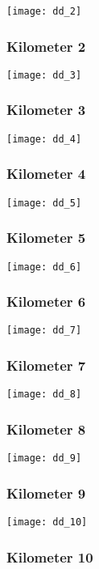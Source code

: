 \documentclass[]{article}
\begin{document}
\texttt{[image: dd\_2]}

\subsubsection{Kilometer 2}\label{kilometer-2-29}

\texttt{[image: dd\_3]}

\subsubsection{Kilometer 3}\label{kilometer-3-29}

\texttt{[image: dd\_4]}

\subsubsection{Kilometer 4}\label{kilometer-4-28}

\texttt{[image: dd\_5]}

\subsubsection{Kilometer 5}\label{kilometer-5-23}

\texttt{[image: dd\_6]}

\subsubsection{Kilometer 6}\label{kilometer-6-18}

\texttt{[image: dd\_7]}

\subsubsection{Kilometer 7}\label{kilometer-7-13}

\texttt{[image: dd\_8]}

\subsubsection{Kilometer 8}\label{kilometer-8-8}

\texttt{[image: dd\_9]}

\subsubsection{Kilometer 9}\label{kilometer-9-5}

\texttt{[image: dd\_10]}

\subsubsection{Kilometer 10}\label{kilometer-10-5}
\end{document}
